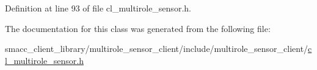 Definition at line 93 of file cl\+\_\+multirole\+\_\+sensor.\+h.



The documentation for this class was generated from the following file\+:\begin{DoxyCompactItemize}
\item 
smacc\+\_\+client\+\_\+library/multirole\+\_\+sensor\+\_\+client/include/multirole\+\_\+sensor\+\_\+client/\hyperlink{cl__multirole__sensor_8h}{cl\+\_\+multirole\+\_\+sensor.\+h}\end{DoxyCompactItemize}

